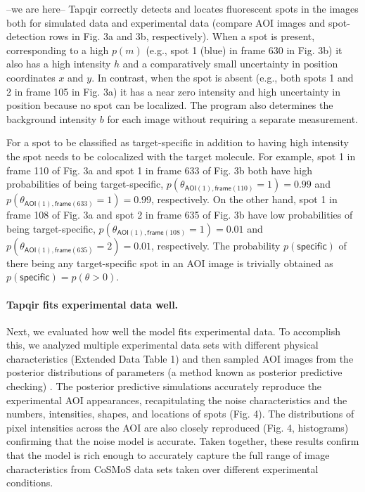 --we are here--
Tapqir correctly detects and locates fluorescent spots in the images both for simulated data and experimental data (compare AOI images and spot-detection rows in Fig. 3a and 3b, respectively). When a spot is present, corresponding to a high $p(m)$ (e.g., spot 1 (blue) in frame 630 in Fig. 3b) it also has a high intensity $h$ and a comparatively small uncertainty in position coordinates $x$ and $y$. In contrast, when the spot is absent (e.g., both spots 1 and 2 in frame 105 in Fig. 3a) it has a near zero intensity and high uncertainty in position because no spot can be localized. The program also determines the background intensity $b$ for each image without requiring a separate measurement. 

For a spot to be classified as target-specific in addition to having high intensity the spot needs to be colocalized with the target molecule. For example, spot 1 in frame 110 of Fig. 3a and spot 1 in frame 633 of Fig. 3b both have high probabilities of being target-specific, $p(\theta_{\mathsf{AOI}(1), \mathsf{frame}(110)}=1) = 0.99$ and $p(\theta_{\mathsf{AOI}(1), \mathsf{frame}(633)}=1) = 0.99$, respectively. On the other hand, spot 1 in frame 108 of Fig. 3a and spot 2 in frame 635 of Fig. 3b have low probabilities of being target-specific, $p(\theta_{\mathsf{AOI}(1), \mathsf{frame}(108)}=1) = 0.01$ and $p(\theta_{\mathsf{AOI}(1), \mathsf{frame}(635)}=2) = 0.01$, respectively. The probability  $p(\mathsf{specific})$ of there being any target-specific spot in an AOI image is trivially obtained as $p(\mathsf{specific}) = p(\theta > 0)$.   


\paragraph{Tapqir fits experimental data well.}
Next, we evaluated how well the model fits experimental data. To accomplish this, we analyzed multiple experimental data sets with different physical characteristics (Extended Data Table 1) and then sampled AOI images from the posterior distributions of parameters (a method known as posterior predictive checking) \cite{Gelman_undated-ro}. The posterior predictive simulations accurately reproduce the experimental AOI appearances, recapitulating the noise characteristics and the numbers, intensities, shapes, and locations of spots (Fig. 4).  The distributions of pixel intensities across the AOI are also closely reproduced (Fig. 4, histograms) confirming that the noise model is accurate. Taken together, these results confirm that the model is rich enough to accurately capture the full range of image characteristics from CoSMoS data sets taken over different experimental conditions.

